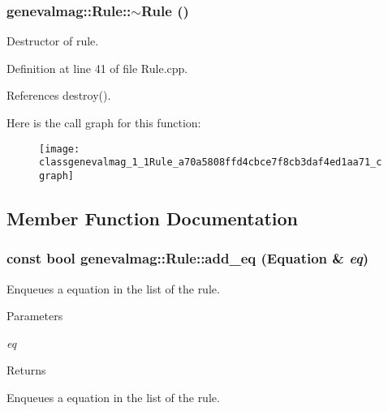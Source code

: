 \hypertarget{classgenevalmag_1_1Rule_a70a5808ffd4cbce7f8cb3daf4ed1aa71}{
\subsubsection[{$\sim$Rule}]{\setlength{\rightskip}{0pt plus 5cm}genevalmag::Rule::$\sim$Rule ()}}
\label{classgenevalmag_1_1Rule_a70a5808ffd4cbce7f8cb3daf4ed1aa71}
Destructor of rule. 

Definition at line 41 of file Rule.cpp.



References destroy().



Here is the call graph for this function:\nopagebreak
\begin{figure}[H]
\begin{center}
\leavevmode
\texttt{[image: classgenevalmag\_1\_1Rule\_a70a5808ffd4cbce7f8cb3daf4ed1aa71\_cgraph]}
\end{center}
\end{figure}




\subsection{Member Function Documentation}
\hypertarget{classgenevalmag_1_1Rule_a55196f34d7b5a4793e089f1332d4c8b0}{
\subsubsection[{add\_\-eq}]{\setlength{\rightskip}{0pt plus 5cm}const bool genevalmag::Rule::add\_\-eq ({\bf Equation} \& {\em eq})}}
\label{classgenevalmag_1_1Rule_a55196f34d7b5a4793e089f1332d4c8b0}
Enqueues a equation in the list of the rule. 
\begin{DoxyParams}{Parameters}
\item[{\em eq}]\end{DoxyParams}
\begin{DoxyReturn}{Returns}

\end{DoxyReturn}
Enqueues a equation in the list of the rule. 

